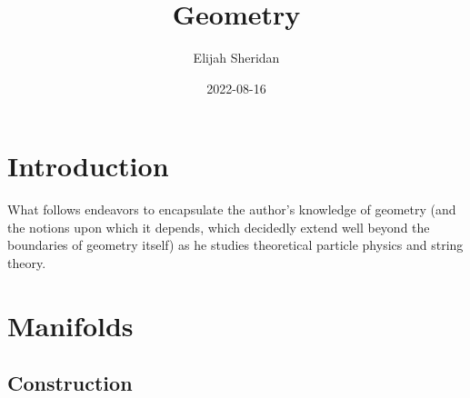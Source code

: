 \documentclass[
]{book}
\title{Geometry}
\author{Elijah Sheridan}
\date{2022-08-16}
\begin{document}
\maketitle

{
\setcounter{tocdepth}{1}
\tableofcontents
}
\hypertarget{introduction}{%
\chapter*{Introduction}\label{introduction}}

What follows endeavors to encapsulate the author's knowledge of geometry (and the notions upon which it depends, which decidedly extend well beyond the boundaries of geometry itself) as he studies theoretical particle physics and string theory.

\hypertarget{manifolds}{%
\chapter{Manifolds}\label{manifolds}}

\hypertarget{construction}{%
\section{Construction}\label{construction}}
\end{document}

